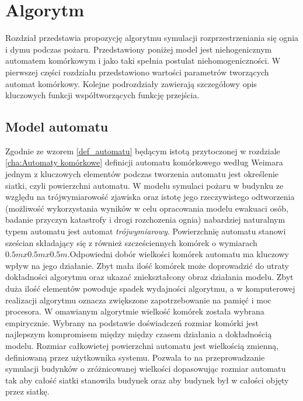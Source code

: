 ﻿%
\chapter{Algorytm}
\label{cha:Algorytm}
Rozdział przedstawia propozycję algorytmu symulacji rozprzestrzeniania się ognia i dymu podczas pożaru.
Przedstawiony poniżej model jest niehogenicznym automatem komórkowym i jako taki spełnia postulat niehomogeniczności.
W pierwszej części rozdziału przedstawiono wartości parametrów tworzących automat komórkowy. Kolejne podrozdziały 
zawierają szczegółowy opis kluczowych funkcji współtworzących funkcję przejścia.
\section {Model automatu}
Zgodnie ze wzorem \ref{def_automatu} będącym istotą przytoczonej w rozdziale \ref{cha:Automaty komórkowe} definicji automatu komórkowego według Weimara jednym z kluczowych elementów podczas tworzenia automatu jest określenie siatki, czyli powierzchni automatu. W modelu symulaci pożaru w budynku
ze względu na trójwymiarowość zjawiska oraz istotę jego rzeczywistego odtworzenia (możliwość wykorzystania wyników w celu
opracowania modelu ewakuaci osób, badanie przyczyn katastrofy i drogi rozchozenia ognia) nabardziej naturalnym typem automatu 
jest automat \textsl {trójwymiarowy}. Powierzchnię automatu stanowi sześcian składający się z również szcześciennych komórek o wymiarach $0.5m x 0.5m x 0.5m$.Odpowiedni dobór wielkości komórek automatu ma kluczowy wpływ na jego działanie. Zbyt mała ilość komórek może doprowadzić do utraty
dokładności algorytmu oraz ukazać zniekształcony obraz działania modelu. Zbyt duża ilość elementów powoduje spadek wydajności algorytmu, a w komputerowej realizacji algorytmu oznacza zwiększone zapotrzebowanie na pamięć i moc procesora. W omawianym algorytmie
wielkość komórek została wybrana empirycznie.
Wybrany na podstawie doświadczeń rozmiar komórki jest najlepszym
kompromisem między między czasem działania a dokładnością modelu.
Rozmiar całkowietej powierzchni automatu jest wielkością zmienną, definiowaną przez użytkownika systemu. Pozwala to na przeprowadzanie symulacji budynków o zróżnicowanej wielkości dopasowując rozmiar automatu tak aby całość
siatki stanowiła budynek oraz aby budynek był w całości objęty przez siatkę. 



